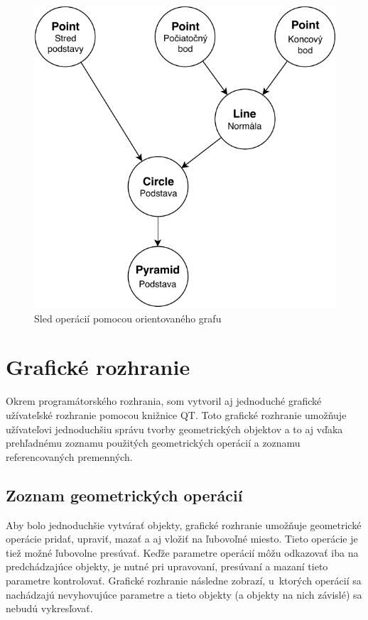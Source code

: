 \begin{figure}[H]
	\centering
	\includegraphics[height=0.6\textwidth]{obrazky-figures/DP Navrh operacii-Strom.pdf}
	\caption{Sled operácií pomocou orientovaného grafu}
	\label{fig:Sled_operácii_pomocou_orientovaného_grafu}
\end{figure}
























\section{Grafické rozhranie}
Okrem programátorského rozhrania, som vytvoril aj jednoduché grafické užívateľské rozhranie pomocou knižnice QT. Toto grafické rozhranie umožňuje užívateľovi jednoduchšiu správu tvorby geometrických objektov a to aj vďaka prehľadnému zoznamu použitých geometrických operácií a zoznamu referencovaných premenných. 

\subsection*{Zoznam geometrických operácií}
Aby bolo jednoduchšie vytvárať objekty, grafické rozhranie umožňuje geometrické operácie pridať, upraviť, mazať a aj vložiť na ľubovoľné miesto. Tieto operácie je tiež možné ľubovolne presúvať. Keďže parametre operácií môžu odkazovať iba na predchádzajúce objekty, je nutné pri upravovaní, presúvaní a mazaní tieto parametre kontrolovať. Grafické rozhranie následne zobrazí, u~ktorých operácií sa nachádzajú nevyhovujúce parametre a tieto objekty (a objekty na nich závislé) sa nebudú vykresľovať.

